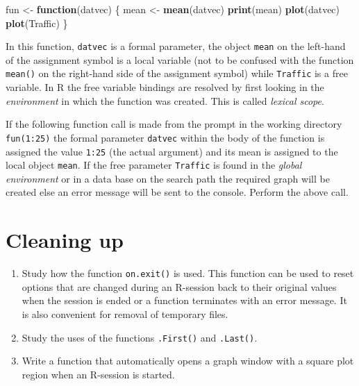 \documentclass[
]{book}
\newenvironment{Shaded}{\begin{snugshade}}{\end{snugshade}}
\newcommand{\ControlFlowTok}[1]{\textcolor[rgb]{0.13,0.29,0.53}{\textbf{#1}}}
\newcommand{\FunctionTok}[1]{\textcolor[rgb]{0.13,0.29,0.53}{\textbf{#1}}}
\newcommand{\NormalTok}[1]{#1}
\newcommand{\OtherTok}[1]{\textcolor[rgb]{0.56,0.35,0.01}{#1}}
\begin{document}
\begin{Shaded}
\begin{Highlighting}[]
\NormalTok{fun }\OtherTok{\textless{}{-}} \ControlFlowTok{function}\NormalTok{(datvec) \{}
\NormalTok{          mean }\OtherTok{\textless{}{-}} \FunctionTok{mean}\NormalTok{(datvec)}
          \FunctionTok{print}\NormalTok{(mean)}
          \FunctionTok{plot}\NormalTok{(datvec)}
          \FunctionTok{plot}\NormalTok{(Traffic)}
\NormalTok{       \}}
\end{Highlighting}
\end{Shaded}

In this function, \texttt{datvec} is a formal parameter, the object \texttt{mean} on the left-hand of the assignment symbol is a local variable (not to be confused with the function \texttt{mean()} on the right-hand side of the assignment symbol) while \texttt{Traffic} is a free variable. In R the free variable bindings are resolved by first looking in the \emph{{environment}} in which the function was created. This is called \emph{{lexical scope}}.

If the following function call is made from the prompt in the working directory \texttt{fun(1:25)} the formal parameter \texttt{datvec} within the body of the function is assigned the value \texttt{1:25} (the actual argument) and its mean is assigned to the local object \texttt{mean}. If the free parameter \texttt{Traffic} is found in the \emph{{global environment}} or in a data base on the search path the required graph will be created else an error message will be sent to the console. Perform the above call.

\section{Cleaning up}\label{cleaning-up}

\begin{enumerate}
\def\labelenumi{(\alph{enumi})}
\item
  Study how the function \texttt{on.exit()} is used. This function can be used to reset options that are changed during an R-session back to their original values when the session is ended or a function terminates with an error message. It is also convenient for removal of temporary files.
\item
  Study the uses of the functions \texttt{.First()} and \texttt{.Last()}.
\item
  Write a function that automatically opens a graph window with a square plot region when an R-session is started.
\end{enumerate}
\end{document}
